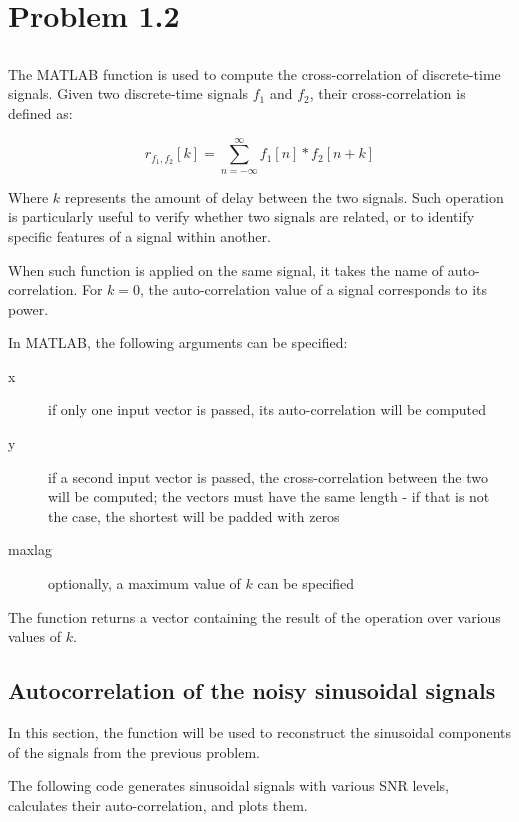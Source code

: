 \section{Problem 1.2}

\subsection{}
The MATLAB function  is used to compute the cross-correlation of discrete-time signals.
Given two discrete-time signals $f_1$ and $f_2$, their cross-correlation is defined as:

\begin{equation}
	r_{f_1, f_2}[k] = \sum_{n=-\infty}^{\infty}f_1[n] * f_2[n+k]
\end{equation}

Where $k$ represents the amount of delay between the two signals.
Such operation is particularly useful to verify whether two signals are related, or to identify specific features of a signal within another.

When such function is applied on the same signal, it takes the name of auto-correlation.
For $k=0$, the auto-correlation value of a signal corresponds to its power.

In MATLAB, the following arguments can be specified:
\begin{description}
	\item[x] if only one input vector is passed, its auto-correlation will be computed
	\item[y] if a second input vector is passed, the cross-correlation between the two will be computed; the vectors must have the same length - if that is not the case, the shortest will be padded with zeros
	\item[maxlag] optionally, a maximum value of $k$ can be specified
\end{description}

The function returns a vector containing the result of the operation over various values of $k$.


\subsection{Autocorrelation of the noisy sinusoidal signals}
In this section, the  function will be used to reconstruct the sinusoidal components of the signals from the previous problem.

The following code generates sinusoidal signals with various SNR levels, calculates their auto-correlation, and plots them.

